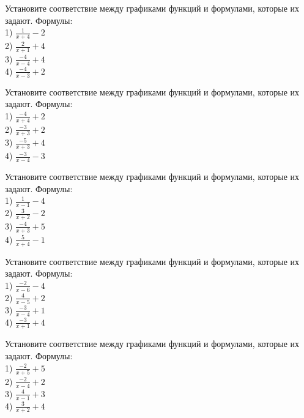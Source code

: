 \documentclass[4apaper]{article}
\begin{document}
\begin{taskBN}{56}
Установите соответствие между графиками функций и формулами, которые их задают. Формулы: \\1) $\frac{1}{x+4}-2$\\2) $\frac{2}{x+1}+4$\\3) $\frac{-4}{x-4}+4$\\4) $\frac{-4}{x-3}+2$
\end{taskBN}

\begin{taskBN}{57}
Установите соответствие между графиками функций и формулами, которые их задают. Формулы: \\1) $\frac{-4}{x+4}+2$\\2) $\frac{-3}{x+3}+2$\\3) $\frac{-5}{x+3}+4$\\4) $\frac{-3}{x-4}-3$
\end{taskBN}

\begin{taskBN}{58}
Установите соответствие между графиками функций и формулами, которые их задают. Формулы: \\1) $\frac{1}{x-1}-4$\\2) $\frac{3}{x+2}-2$\\3) $\frac{-4}{x+3}+5$\\4) $\frac{5}{x+4}-1$
\end{taskBN}

\begin{taskBN}{59}
Установите соответствие между графиками функций и формулами, которые их задают. Формулы: \\1) $\frac{-2}{x-6}-4$\\2) $\frac{4}{x-5}+2$\\3) $\frac{-3}{x-4}+1$\\4) $\frac{-3}{x+1}+4$
\end{taskBN}

\begin{taskBN}{60}
Установите соответствие между графиками функций и формулами, которые их задают. Формулы: \\1) $\frac{-2}{x+5}+5$\\2) $\frac{-2}{x-4}+2$\\3) $\frac{4}{x-1}+3$\\4) $\frac{3}{x+2}+4$
\end{taskBN}
\end{document}
